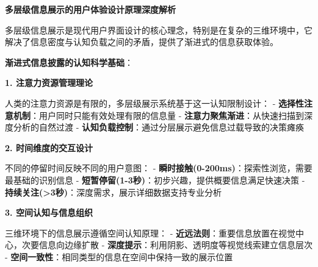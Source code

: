 \begin{Shaded}
\begin{Highlighting}[]
        \OperatorTok{=} \NormalTok{()}\OperatorTok{;}
        \OperatorTok{=} \OperatorTok{*}  \OperatorTok{+} \NormalTok{) }\OperatorTok{*} \OperatorTok{+}\OperatorTok{;}
        \OperatorTok{=}\NormalTok{ (}\OperatorTok{{-}} \OperatorTok{*}  \OperatorTok{+} \NormalTok{) }\OperatorTok{*} \OperatorTok{+}\OperatorTok{;}
        
        \NormalTok{ \{ }\OperatorTok{:}\OperatorTok{,} \OperatorTok{:}\OperatorTok{;}
\NormalTok{    \}}
\NormalTok{\}}
\end{Highlighting}
\end{Shaded}

\textbf{多层级信息展示的用户体验设计原理深度解析}

多层级信息展示是现代用户界面设计的核心理念，特别是在复杂的三维环境中，它解决了信息密度与认知负载之间的矛盾，提供了渐进式的信息获取体验。

\textbf{渐进式信息披露的认知科学基础}：

\textbf{1. 注意力资源管理理论}

人类的注意力资源是有限的，多层级展示系统基于这一认知限制设计： - \textbf{选择性注意机制}：用户同时只能有效处理有限的信息量 - \textbf{注意力聚焦渐进}：从快速扫描到深度分析的自然过渡 - \textbf{认知负载控制}：通过分层展示避免信息过载导致的决策瘫痪

\textbf{2. 时间维度的交互设计}

不同的停留时间反映不同的用户意图： - \textbf{瞬时接触(0-200ms)}：探索性浏览，需要最基础的识别信息 - \textbf{短暂停留(1-3秒)}：初步兴趣，提供概要信息满足快速决策 - \textbf{持续关注(\textgreater3秒)}：深度需求，展示详细数据支持专业分析

\textbf{3. 空间认知与信息组织}

三维环境下的信息展示遵循空间认知原理： - \textbf{近远法则}：重要信息放置在视觉中心，次要信息向边缘扩散 - \textbf{深度提示}：利用阴影、透明度等视觉线索建立信息层次 - \textbf{空间一致性}：相同类型的信息在空间中保持一致的展示位置

